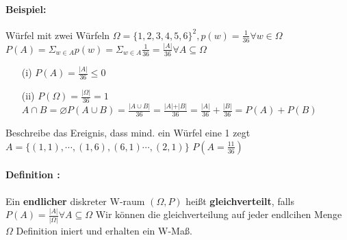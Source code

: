 \documentclass{article}
\begin{document}
\paragraph*{Beispiel:} Würfel mit zwei Würfeln \(\Omega = \{1, 2, 3, 4, 5, 6\}^2, p(w) = \frac{1}{36} \forall w \in \Omega\) \\ \(P(A) = \Sigma_{w \in A} p(w) = \Sigma_{w \in A} \frac{1}{36} = \frac{\vert A \vert}{36} \forall A \subseteq \Omega\)
\begin{itemize}
    \item [(i)] \(P(A) = \frac{\vert A \vert}{36} \leq 0\)
    \item [(ii)] \(P(\Omega) = \frac{\vert \Omega \vert}{36} = 1\) \\ \(A \cap B  = \varnothing P(A \cup B) = \frac{\vert A \cup B \vert}{36} = \frac{\vert A \vert + \vert B \vert}{36} = \frac{\vert A \vert }{36} + \frac{\vert B \vert }{36} = P(A) + P(B)\)
\end{itemize}

Beschreibe das Ereignis, dass mind. ein Würfel eine 1 zegt \(A = \{(1,1), \cdots, (1,6), (6,1) \cdots, (2,1)\}\) \(P(A = \frac{11}{36})\)

\paragraph*{Definition : } Ein \textbf{endlicher} diskreter W-raum \((\Omega, P)\) heißt \textbf{gleichverteilt}, falls \(P(A) = \frac{\vert A \vert}{\vert \Omega \vert} \forall A \subseteq \Omega\) Wir können die gleichverteilung auf jeder endlcihen Menge \(\Omega\) Definition iniert und erhalten ein W-Maß.
\end{document}
